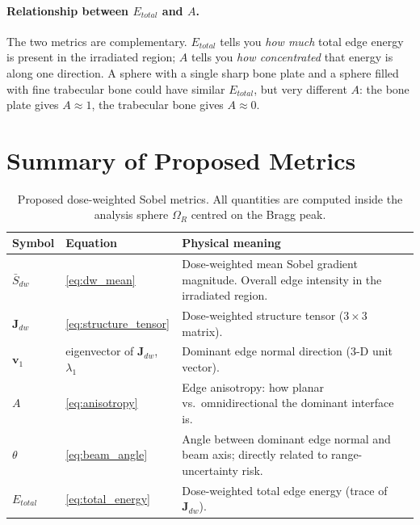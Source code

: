 \documentclass[11pt,a4paper]{article}
\newcommand{\vv}{\mathbf{v}}
\newcommand{\vJ}{\mathbf{J}}
\begin{document}
\paragraph{Relationship between $E_{total}$ and $A$.}
The two metrics are complementary.
$E_{total}$ tells you \emph{how much} total edge energy is present in the
irradiated region; $A$ tells you \emph{how concentrated} that energy is
along one direction.
A sphere with a single sharp bone plate and a sphere filled with fine
trabecular bone could have similar $E_{total}$, but very different $A$:
the bone plate gives $A \approx 1$, the trabecular bone gives $A \approx 0$.

\section{Summary of Proposed Metrics}

\begin{table}[h!]
    \centering
    \caption{Proposed dose-weighted Sobel metrics.
             All quantities are computed inside the analysis sphere
             $\Omega_R$ centred on the Bragg peak.}
    \label{tab:metrics}
    \begin{tabular}{llp{7cm}}
        \toprule
        Symbol & Equation & Physical meaning \\
        \midrule
        $\bar{S}_{dw}$  & \eqref{eq:dw_mean}
            & Dose-weighted mean Sobel gradient magnitude.
              Overall edge intensity in the irradiated region. \\
        $\vJ_{dw}$      & \eqref{eq:structure_tensor}
            & Dose-weighted structure tensor ($3\times3$ matrix). \\
        $\vv_1$         & eigenvector of $\vJ_{dw}$, $\lambda_1$
            & Dominant edge normal direction (3-D unit vector). \\
        $A$             & \eqref{eq:anisotropy}
            & Edge anisotropy: how planar vs.\ omnidirectional the
              dominant interface is. \\
        $\theta$        & \eqref{eq:beam_angle}
            & Angle between dominant edge normal and beam axis;
              directly related to range-uncertainty risk. \\
        $E_{total}$     & \eqref{eq:total_energy}
            & Dose-weighted total edge energy (trace of $\vJ_{dw}$). \\
        \bottomrule
    \end{tabular}
\end{table}
\end{document}
